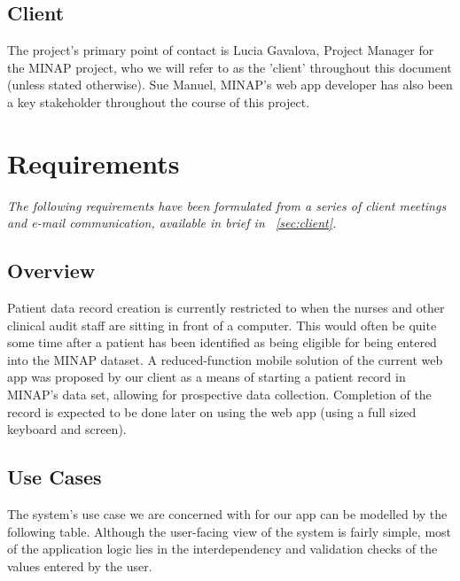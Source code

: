 \documentclass[12pt,a4paper,oneside,titlepage]{article}
\begin{document}
\subsection{Client}
The project's primary point of contact is Lucia Gavalova, Project Manager for the MINAP project, who we will refer to as the 'client' throughout this document (unless stated otherwise). Sue Manuel, MINAP's web app developer has also been a key stakeholder throughout the course of this project.

\newpage
\section{Requirements}
\textit{The following requirements have been formulated from a series of client meetings and e-mail communication, available in brief in ~\cref{sec:client}.}

\subsection{Overview}
Patient data record creation is currently restricted to when the nurses and other clinical audit staff are sitting in front of a computer. This would often be quite some time after a patient has been identified as being eligible for being entered into the MINAP dataset. A reduced-function mobile solution of the current web app was proposed by our client as a means of starting a patient record in MINAP's data set, allowing for prospective data collection. Completion of the record is expected to be done later on using the web app (using a full sized keyboard and screen).

\subsection{Use Cases}
The system's use case we are concerned with for our app can be modelled by the following table. Although the user-facing view of the system is fairly simple, most of the application logic lies in the interdependency and validation checks of the values entered by the user. 
\end{document}
